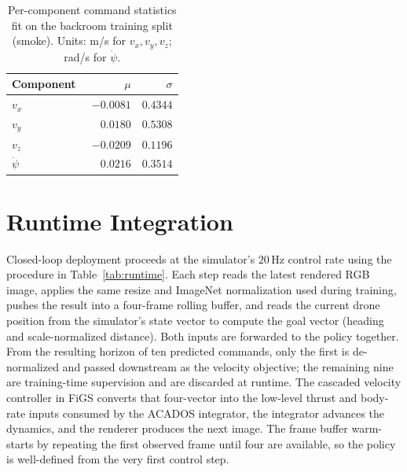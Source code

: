 \documentclass[10pt,twocolumn,letterpaper]{article}
\begin{document}
\begin{table}[t]
\centering
\caption{Per-component command statistics fit on the backroom training split (smoke). Units: m/s for $v_x,v_y,v_z$; rad/s for $\dot{\psi}$.}
\label{tab:stats}
\small
\begin{tabular}{@{}lrr@{}}
\toprule
Component & $\mu$ & $\sigma$ \\
\midrule
$v_x$        & $-0.0081$ & $0.4344$ \\
$v_y$        & $\phantom{-}0.0180$ & $0.5308$ \\
$v_z$        & $-0.0209$ & $0.1196$ \\
$\dot{\psi}$ & $\phantom{-}0.0216$ & $0.3514$ \\
\bottomrule
\end{tabular}
\end{table}

\section{Runtime Integration}
\label{sec:runtime}

Closed-loop deployment proceeds at the simulator's $20\,\mathrm{Hz}$ control rate using the procedure in Table~\ref{tab:runtime}. Each step reads the latest rendered RGB image, applies the same resize and ImageNet normalization used during training, pushes the result into a four-frame rolling buffer, and reads the current drone position from the simulator's state vector to compute the goal vector (heading and scale-normalized distance). Both inputs are forwarded to the policy together. From the resulting horizon of ten predicted commands, only the first is de-normalized and passed downstream as the velocity objective; the remaining nine are training-time supervision and are discarded at runtime. The cascaded velocity controller in FiGS converts that four-vector into the low-level thrust and body-rate inputs consumed by the ACADOS integrator, the integrator advances the dynamics, and the renderer produces the next image. The frame buffer warm-starts by repeating the first observed frame until four are available, so the policy is well-defined from the very first control step.
\end{document}
